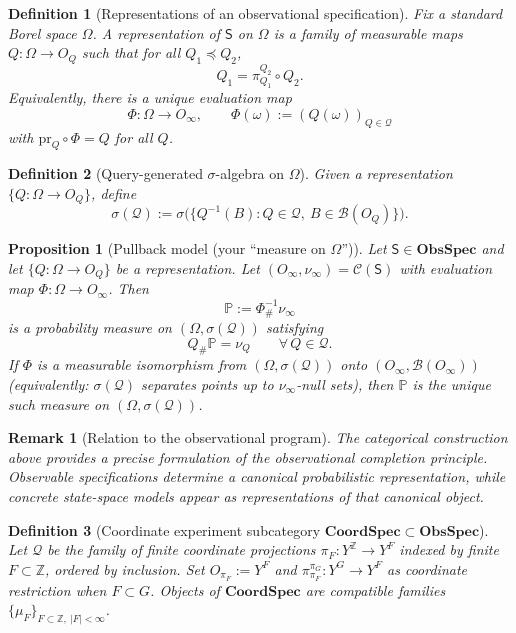 \documentclass[11pt]{article}
\newtheorem{definition}{Definition}
\newtheorem{proposition}{Proposition}
\newtheorem{remark}{Remark}
\begin{document}

\begin{definition}[Representations of an observational specification]
Fix a standard Borel space $\Omega$.
A \emph{representation} of $\mathsf S$ on $\Omega$ is a family of measurable maps
$Q:\Omega\to O_Q$ such that for all $Q_1\preceq Q_2$,
\[
Q_1 = \pi^{Q_2}_{Q_1}\circ Q_2.
\]
Equivalently, there is a unique evaluation map
\[
\Phi:\Omega\to O_\infty,\qquad \Phi(\omega):=(Q(\omega))_{Q\in\mathcal Q}
\]
with $\mathrm{pr}_Q\circ \Phi = Q$ for all $Q$.
\end{definition}

\begin{definition}[Query-generated $\sigma$-algebra on $\Omega$]
Given a representation $\{Q:\Omega\to O_Q\}$, define
\[
\sigma(\mathcal Q) := \sigma\big(\{Q^{-1}(B):Q\in\mathcal Q,\ B\in\mathcal B(O_Q)\}\big).
\]
\end{definition}

\begin{proposition}[Pullback model (your “measure on $\Omega$”)]
Let $\mathsf S\in\mathbf{ObsSpec}$ and let $\{Q:\Omega\to O_Q\}$ be a representation.
Let $(O_\infty,\nu_\infty)=\mathcal C(\mathsf S)$ with evaluation map $\Phi:\Omega\to O_\infty$.
Then
\[
\mathbb P := \Phi^{-1}_\#\nu_\infty
\]
is a probability measure on $(\Omega,\sigma(\mathcal Q))$ satisfying
\[
Q_\#\mathbb P = \nu_Q\qquad\forall\,Q\in\mathcal Q.
\]
If $\Phi$ is a measurable isomorphism from $(\Omega,\sigma(\mathcal Q))$ onto $(O_\infty,\mathcal B(O_\infty))$
(equivalently: $\sigma(\mathcal Q)$ separates points up to $\nu_\infty$-null sets), then $\mathbb P$
is the unique such measure on $(\Omega,\sigma(\mathcal Q))$.
\end{proposition}

\begin{remark}[Relation to the observational program]
The categorical construction above provides a precise formulation of the
observational completion principle.  Observable specifications determine
a canonical probabilistic representation, while concrete state-space
models appear as representations of that canonical object.
\end{remark}


\begin{definition}[Coordinate experiment subcategory $\mathbf{CoordSpec}\subset \mathbf{ObsSpec}$]
Let $\mathcal Q$ be the family of finite coordinate projections $\pi_F:Y^{\mathbb Z}\to Y^F$
indexed by finite $F\subset\mathbb Z$, ordered by inclusion.
Set $O_{\pi_F}:=Y^F$ and $\pi^{\pi_G}_{\pi_F}:Y^G\to Y^F$ as coordinate restriction when $F\subset G$.
Objects of $\mathbf{CoordSpec}$ are compatible families $\{\mu_F\}_{F\subset\mathbb Z,\ |F|<\infty}$.
\end{definition}
\end{document}
